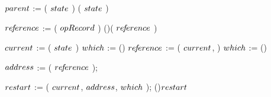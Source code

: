 \begin{limitscope}
\begin{algorithm}[tbh]
{{	    \BlankLine
			
			{
			   \label{lin:local-seek|successor:while:clean:begin}
			   \If{\NeedCleanParentNode( $\opRecord$, $\cNode$ )}
		     {
				    
				    $\pNode$ := \GetSecondToTop( $state$ )\;
				    \If{\LNot(\IsClean( $\pNode$ ))}
				    {
				       \RemoveFromTop( $state$ )\;
					     \Continue\;
							 \label{lin:local-seek|successor:while:clean:end}
				    }
			   }
				
			}
			
			
	    $re\!f\!erence$ := \NeedSuccessorKey( $\opRecord$ )\;
			\label{lin:local-seek|successor:while:need|successor}
			\If(){\IsNull( $re\!f\!erence$ )}{ 
			   \Return \false\;
			}
					
			$\cNode$ := \GetTop( $state$ )\;
			{
			   \label{lin:local-seek|successor:while:traversal:if:begin}
			   $which$ := \RIGHT\;
				 \label{lin:local-seek|successor:while:traversal:if:end}
			}
			\Else()
			{
			   \label{lin:local-seek|successor:while:traversal:else:begin}
		 	   $re\!f\!erence$ := \GetChild( $\cNode$, \LEFT{} )\;
			   $which$ := \LEFT\;
				 \label{lin:local-seek|successor:while:traversal:else:end}
			}
			\Repeat(){\True}
	    {
			   \label{lin:local-seek|successor:while:traversal:begin}
				
				 $address$ := \GetAddress( $re\!f\!erence$ ); 
				
				 
				 $restart$ := \Move( $\cNode$, $address$, $which$ ); 
				 \label{lin:local-seek|successor:while:traversal:move}
			   \If(){$restart$}
			   {
				    \Break\;
						\label{lin:local-seek|successor:while:traversal:restart}
			   }  
				 
}}}
\end{algorithm}
\end{limitscope}
